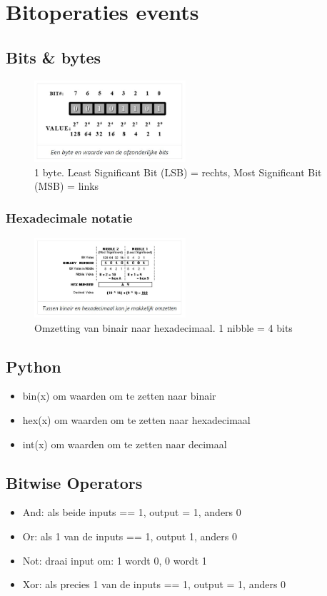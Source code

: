 \documentclass{article}
\begin{document}
\section{Bitoperaties events}
\subsection{Bits \& bytes}
\begin{figure}[H]
    \centering
    \includegraphics[width=0.5\textwidth]{bits.png}
    \caption{1 byte. Least Significant Bit (LSB) = rechts, Most Significant Bit (MSB) = links}
\end{figure}

\subsubsection{Hexadecimale notatie}
\begin{figure}[H]
    \centering
    \includegraphics[width=0.5\textwidth]{hexa.png}
    \caption{Omzetting van binair naar hexadecimaal. 1 nibble = 4 bits}
\end{figure}

\subsection{Python}
\begin{itemize}
    \item bin(x) om waarden om te zetten naar binair
    \item hex(x) om waarden om te zetten naar hexadecimaal
    \item int(x) om waarden om te zetten naar decimaal
\end{itemize}

\subsection{Bitwise Operators}
\begin{itemize}
    \item And: als beide inputs == 1, output = 1, anders 0
    \item Or: als 1 van de inputs == 1, output 1, anders 0
    \item Not: draai input om: 1 wordt 0, 0 wordt 1
    \item Xor: als precies 1 van de inputs == 1, output = 1, anders 0
\end{itemize}
\end{document}
